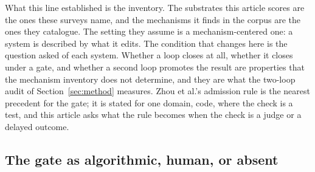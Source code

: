 \documentclass[
  11pt,
]{article}
\begin{document}
What this line established is the inventory. The substrates this article scores are the ones these surveys name, and the mechanisms it finds in the corpus are the ones they catalogue. The setting they assume is a mechanism-centered one: a system is described by what it edits. The condition that changes here is the question asked of each system. Whether a loop closes at all, whether it closes under a gate, and whether a second loop promotes the result are properties that the mechanism inventory does not determine, and they are what the two-loop audit of Section~\ref{sec:method} measures. Zhou et al.'s admission rule is the nearest precedent for the gate; it is stated for one domain, code, where the check is a test, and this article asks what the rule becomes when the check is a judge or a delayed outcome.

\subsection{The gate as algorithmic, human, or absent}\label{app:related-2}
\end{document}
